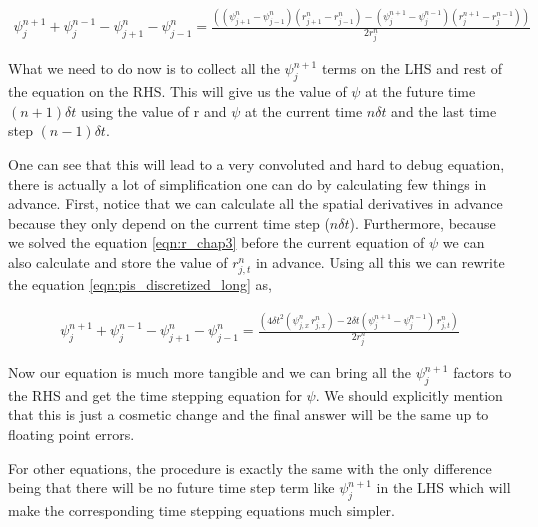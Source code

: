 \begin{multline}
    \psi^{n+1}_{j} + \psi^{n-1}_{j} - \psi^{n}_{j+1} - \psi^{n}_{j-1} = \frac{((\psi^{n}_{j+1} - \psi^{n}_{j-1})(r^{n}_{j+1} - r^{n}_{j-1}) - (\psi^{n+1}_{j} - \psi^{n-1}_{j})(r^{n+1}_{j} - r^{n-1}_{j}))}{2 r^n_j}
    \label{eqn:pis_discretized_long}
\end{multline}

What we need to do now is to collect all the $\psi^{n+1}_j$ terms on the LHS and rest of the equation on the RHS. This will give us the value of $\psi$ at the future time $(n+1) \delta t$ using the value of r and $\psi$ at the current time $n \delta t$ and the last time step $ (n-1) \delta t$.


One can see that this will lead to a very convoluted and hard to debug equation, there is actually a lot of simplification one can do by calculating few things in advance. First, notice that we can calculate all the spatial derivatives in advance because they only depend on the current time step ($n \delta t$). Furthermore, because we solved the equation \ref{eqn:r_chap3} before the current equation of $\psi$ we can also calculate and store the value of $r^n_{j,t}$ in advance. Using all this we can rewrite the equation \ref{eqn:pis_discretized_long} as,


\begin{multline}
    \psi^{n+1}_{j} + \psi^{n-1}_{j} - \psi^{n}_{j+1} - \psi^{n}_{j-1} = \frac{(4\delta t^2 (\psi^{n}_{j,x} \, r^{n}_{j,x}) - 2 \delta t(\psi^{n+1}_{j} - \psi^{n-1}_{j})\,r^{n}_{j,t})}{2 r^n_j}
    \label{eqn:final_psi}
\end{multline}

Now our equation is much more tangible and we can bring all the $\psi^{n+1}_j$ factors to the RHS and get the time stepping equation for $\psi$. We should explicitly mention that this is just a cosmetic change and the final answer will be the same up to floating point errors.

For other equations, the procedure is exactly the same with the only difference being that there will be no future time step term like $\psi^{n+1}_j$ in the LHS which will make the corresponding time stepping equations much simpler.


